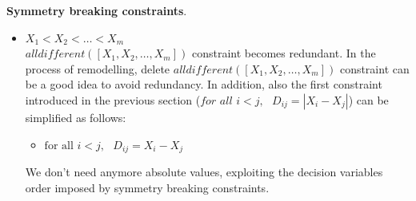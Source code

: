 \begin{example}[title = Simplified improved model]
    \textbf{Symmetry breaking constraints}.
    \begin{itemize}
        \renewcommand{\labelitemi}{-}
        \item $X_1 < X_2 < \dots < X_m$ \\ $\textit{alldifferent}([X_1, X_2, \dots, X_m])$ constraint becomes redundant. In the process of remodelling, delete $\textit{alldifferent}([X_1, X_2, \dots, X_m])$ constraint can be a good idea to avoid redundancy. In addition, also the first constraint introduced in the previous section ($\textit{for all } i < j, \textit{ } D_{ij} = |X_i - X_j|$) can be simplified as follows:
        \begin{itemize}
            \renewcommand{\labelitemi}{-}
            \item $\text{for all } i < j, \text{ } D_{ij} = X_i - X_j$
        \end{itemize}
        We don't need anymore absolute values, exploiting the decision variables order imposed by symmetry breaking constraints.
    \end{itemize} \vspace{7pt}
\end{example}
